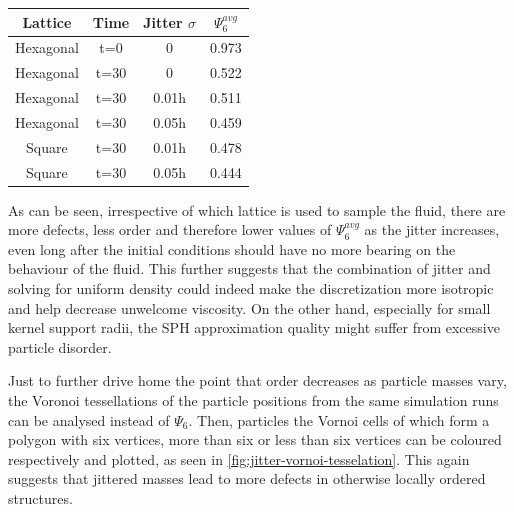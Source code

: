 \begin{samepage}
  \begin{center}
    \begin{tabular}{|c | c | c || c|}
      \hline
      Lattice   & Time & Jitter $\sigma$ & $\Psi_6^{avg}$ \\
      \hline\hline
      Hexagonal & t=0  & 0               & 0.973          \\\hline
      Hexagonal & t=30 & 0               & 0.522          \\\hline
      Hexagonal & t=30 & 0.01h           & 0.511          \\\hline
      Hexagonal & t=30 & 0.05h           & 0.459          \\\hline
      Square    & t=30 & 0.01h           & 0.478          \\\hline
      Square    & t=30 & 0.05h           & 0.444          \\\hline
    \end{tabular}

  \end{center}
\end{samepage}

As can be seen, irrespective of which lattice is used to sample the fluid, there are more defects, less order and therefore lower values of $\Psi_6^{avg}$ as the jitter increases, even long after the initial conditions should have no more bearing on the behaviour of the fluid. This further suggests that the combination of jitter and solving for uniform density could indeed make the discretization more isotropic and help decrease unwelcome viscosity. On the other hand, especially for small kernel support radii, the SPH approximation quality might suffer from excessive particle disorder.

Just to further drive home the point that order decreases as particle masses vary, the Voronoi tessellations of the particle positions from the same simulation runs can be analysed instead of $\Psi_6$. Then, particles the Vornoi cells of which form a polygon with six vertices, more than six or less than six vertices can be coloured respectively and plotted, as seen in \autoref{fig:jitter-vornoi-tesselation}. This again suggests that jittered masses lead to more defects in otherwise locally ordered structures.

